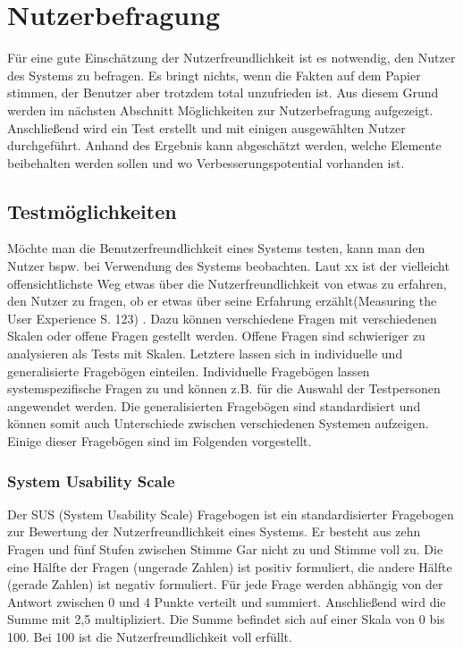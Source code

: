\section{Nutzerbefragung}
\label{6:Nutzerbefragung}
Für eine gute Einschätzung der Nutzerfreundlichkeit ist es notwendig, den Nutzer des Systems zu befragen. Es bringt nichts, wenn die Fakten auf dem Papier stimmen, der Benutzer aber trotzdem total unzufrieden ist. Aus diesem Grund werden im nächsten Abschnitt Möglichkeiten zur Nutzerbefragung aufgezeigt. Anschließend wird ein Test erstellt und mit einigen ausgewählten Nutzer durchgeführt. Anhand des Ergebnis kann abgeschätzt werden, welche Elemente beibehalten werden sollen und wo Verbesserungspotential vorhanden ist.

\subsection{Testmöglichkeiten}
Möchte man die Benutzerfreundlichkeit eines Systems testen, kann man den Nutzer bspw. bei Verwendung des Systems beobachten. Laut xx ist \glqq der vielleicht offensichtlichste Weg etwas über die Nutzerfreundlichkeit von etwas zu erfahren, den Nutzer zu fragen, ob er etwas über seine Erfahrung erzählt\grqq(Measuring the User Experience S. 123) . Dazu können verschiedene Fragen mit verschiedenen Skalen oder offene Fragen gestellt werden. Offene Fragen sind schwieriger zu analysieren als Tests mit Skalen. Letztere lassen sich in individuelle und generalisierte Fragebögen einteilen. Individuelle Fragebögen lassen systemspezifische Fragen zu und können z.B. für die Auswahl der Testpersonen angewendet werden. Die generalisierten Fragebögen sind standardisiert und können somit auch Unterschiede zwischen verschiedenen Systemen aufzeigen. Einige dieser Fragebögen sind im Folgenden vorgestellt.

\subsubsection*{System Usability Scale}
Der SUS (System Usability Scale) Fragebogen ist ein standardisierter Fragebogen zur Bewertung der Nutzerfreundlichkeit eines Systems. Er besteht aus zehn Fragen und fünf Stufen zwischen Stimme Gar nicht zu und Stimme voll zu. Die eine Hälfte der Fragen (ungerade Zahlen) ist positiv formuliert, die andere Hälfte (gerade Zahlen) ist negativ formuliert. Für jede Frage werden abhängig von der Antwort zwischen 0 und 4 Punkte verteilt und summiert. Anschließend wird die Summe mit 2,5 multipliziert. Die Summe befindet sich auf einer Skala von 0 bis 100. Bei 100 ist die Nutzerfreundlichkeit voll erfüllt. 

